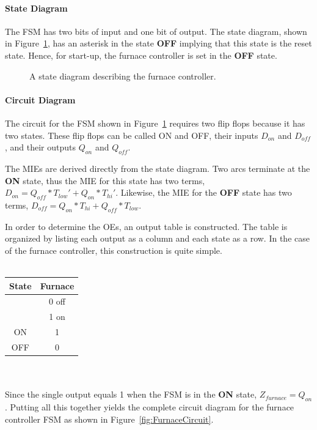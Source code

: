 \paragraph{State Diagram}
The FSM has two bits of input and one bit of
output. The state diagram, shown in Figure~\ref{fig:FurnaceSD}, has
an asterisk in the state {\bf OFF} implying that this state is the reset state. 
Hence, for start-up, the furnace controller is set in the {\bf OFF}
state.

\begin{figure}[ht]
\caption{A state diagram describing the furnace controller.}
\label{fig:FurnaceSD}
\end{figure}

\paragraph{Circuit Diagram}
The circuit for the FSM shown in Figure~\ref{fig:FurnaceSD} requires 
two flip flops because it has two states.  These flip flops can be called
ON and OFF, their inputs $D_{on}$ and $D_{off}$, and their outputs
$Q_{on}$ and $Q_{off}$.

The MIEs are derived directly from the state diagram.  Two arcs
terminate at the {\bf ON} state, thus the MIE for this state  has
two terms, $D_{on} = Q_{off}*T_{low}' + Q_{on}*T_{hi}'$.  Likewise, the
MIE for the {\bf OFF} state has two terms, 
$D_{off} = Q_{on}*T_{hi} + Q_{off}*T_{low}$.

In order to determine the OEs, an output table is constructed.  The 
table is organized by listing each output as a column and each state as a row.
In the case of the furnace controller, this construction is quite simple.
\\ \\
\begin{tabular}{c||c}

State		& Furnace	\\ \hline 
		& 0 off		\\ \hline 
		& 1 on		\\ \hline \hline
ON		& 1		\\ \hline 
OFF		& 0		\\ 

\end{tabular}
\\ \\
Since the single output equals 1 when the FSM is in the {\bf ON} state, 
$Z_{furnace} = Q_{on}$.
Putting all this together yields the complete circuit diagram for the furnace 
controller FSM as shown in Figure~\ref{fig:FurnaceCircuit}.

